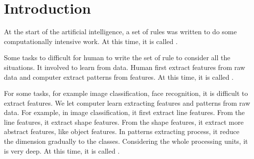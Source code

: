 
\chapter{Introduction}


At the start of the artificial intelligence, a set of rules was written to do some computationally intensive work.
At this time, it is called .

Some tasks to difficult for human to write the set of rule to consider all the situations.
It involved to learn from data.
Human first extract features from raw data and computer extract patterns from features.
At this time, it is called .


For some tasks, for example image classification, face recognition, it is difficult to extract features.
We let computer learn extracting features and patterns from raw data.
For example, in image classification, it first extract line features.
From the line features, it extract shape features.
From the shape features, it extract more abstract features, like object features.
In patterns extracting process, it reduce the dimension gradually to the classes.
Considering the whole processing units, it is very deep.
At this time, it is called .







